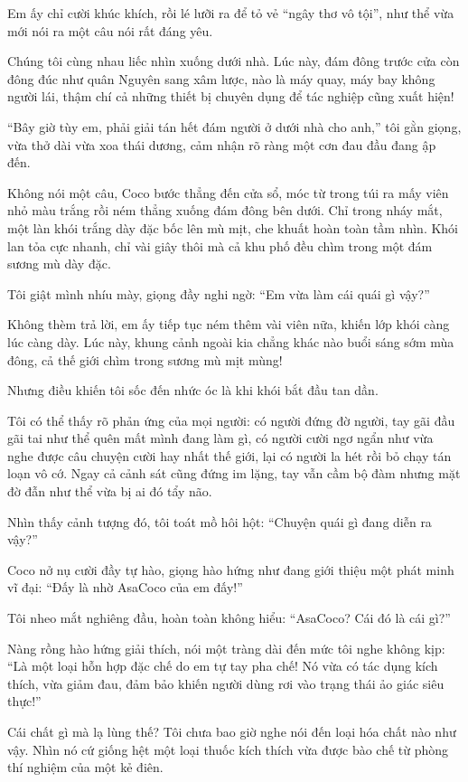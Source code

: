 \documentclass[../main.tex]{subfiles}
\begin{document}
Em ấy chỉ cười khúc khích, rồi lé lưỡi ra để tỏ vẻ ``ngây thơ vô tội'', như thể vừa mới nói ra một câu nói rất đáng yêu.

Chúng tôi cùng nhau liếc nhìn xuống dưới nhà. Lúc này, đám đông trước cửa còn đông đúc như quân Nguyên sang xâm lược, nào là máy quay, máy bay không người lái, thậm chí cả những thiết bị chuyên dụng để tác nghiệp cũng xuất hiện!

``Bây giờ tùy em, phải giải tán hết đám người ở dưới nhà cho anh,'' tôi gằn giọng, vừa thở dài vừa xoa thái dương, cảm nhận rõ ràng một cơn đau đầu đang ập đến.

Không nói một câu, Coco bước thẳng đến cửa sổ, móc từ trong túi ra mấy viên nhỏ màu trắng rồi ném thẳng xuống đám đông bên dưới. Chỉ trong nháy mắt, một làn khói trắng dày đặc bốc lên mù mịt, che khuất hoàn toàn tầm nhìn. Khói lan tỏa cực nhanh, chỉ vài giây thôi mà cả khu phố đều chìm trong một đám sương mù dày đặc.

Tôi giật mình nhíu mày, giọng đầy nghi ngờ: ``Em vừa làm cái quái gì vậy?''

Không thèm trả lời, em ấy tiếp tục ném thêm vài viên nữa, khiến lớp khói càng lúc càng dày. Lúc này, khung cảnh ngoài kia chẳng khác nào buổi sáng sớm mùa đông, cả thế giới chìm trong sương mù mịt mùng!

Nhưng điều khiến tôi sốc đến nhức óc là khi khói bắt đầu tan dần.

Tôi có thể thấy rõ phản ứng của mọi người: có người đứng đờ người, tay gãi đầu gãi tai như thể quên mất mình đang làm gì, có người cười ngơ ngẩn như vừa nghe được câu chuyện cười hay nhất thế giới, lại có người la hét rồi bỏ chạy tán loạn vô cớ. Ngay cả cảnh sát cũng đứng im lặng, tay vẫn cầm bộ đàm nhưng mặt đờ đẫn như thể vừa bị ai đó tẩy não.

Nhìn thấy cảnh tượng đó, tôi toát mồ hôi hột: ``Chuyện quái gì đang diễn ra vậy?''

Coco nở nụ cười đầy tự hào, giọng hào hứng như đang giới thiệu một phát minh vĩ đại: ``Đấy là nhờ AsaCoco của em đấy!''

Tôi nheo mắt nghiêng đầu, hoàn toàn không hiểu: ``AsaCoco? Cái đó là cái gì?''

Nàng rồng hào hứng giải thích, nói một tràng dài đến mức tôi nghe không kịp: ``Là một loại hỗn hợp đặc chế do em tự tay pha chế! Nó vừa có tác dụng kích thích, vừa giảm đau, đảm bảo khiến người dùng rơi vào trạng thái ảo giác siêu thực!''

Cái chất gì mà lạ lùng thế? Tôi chưa bao giờ nghe nói đến loại hóa chất nào như vậy. Nhìn nó cứ giống hệt một loại thuốc kích thích vừa được bào chế từ phòng thí nghiệm của một kẻ điên.
\end{document}
